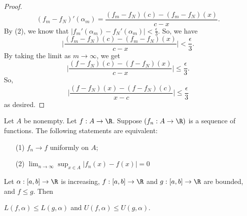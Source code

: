 \begin{proof}
    \[  ({f}_{m}- {f}_{N})'({\alpha}_{m}) = \frac{ ({f}_{m}- {f}_{N})(c) - ({f}_{m}- {f}_{N})(x) }{  c - x  }.  \]
    By (2), we know that \( | {f}_{m}'({\alpha}_{m}) - {f}_{N}'({\alpha}_{m}) |  < \frac{ \epsilon }{ 3 } \). So, we have 
    \[  \Big| \frac{ ({f}_{m} - {f}_{N})(c)- ({f}_{m} - {f}_{N})(x) }{ c - x  }  \Big|  < \frac{ \epsilon }{ 3 }. \]
    By taking the limit as \( m \to \infty   \), we get
    \[  \Big| \frac{ (f - {f}_{N})(c) - (f - {f}_{N})(x) }{  c - x  }    \Big| \leq \frac{ \epsilon }{ 3 }.  \]
    So, 
    \[  \Big| \frac{ (f - {f}_{N})(x) - (f - {f}_{N})(c) }{  x - c  }   \Big|  \leq \frac{ \epsilon }{ 3 } \]
    as desired.
\end{proof}

\begin{lemma}[lemma 1]
    Let \( A  \) be nonempty. Let \( f: A \to \R  \). Suppose \( ({f}_{n}: A \to \R ) \) is a sequence of functions. The following statements are equivalent:
    \begin{enumerate}
        \item[(1)] \( {f}_{n} \to f  \) uniformly on \( A  \);
        \item[(2)] \( \lim_{ n \to \infty  }  \sup_{x \in A } | {f}_{n}(x) - f(x) | = 0   \)
    \end{enumerate}
\end{lemma}

\begin{lemma}[lemma 2]
    Let \( \alpha: [a,b] \to \R  \) is increasing, \( f: [a,b] \to \R  \) and \( g: [a,b] \to \R  \) are bounded, and \( f \leq g  \). Then     
    \begin{center}
        \( L(f,\alpha) \leq L(g, \alpha) \) and \( U(f,\alpha) \leq U(g,\alpha) \).
    \end{center}
\end{lemma}

